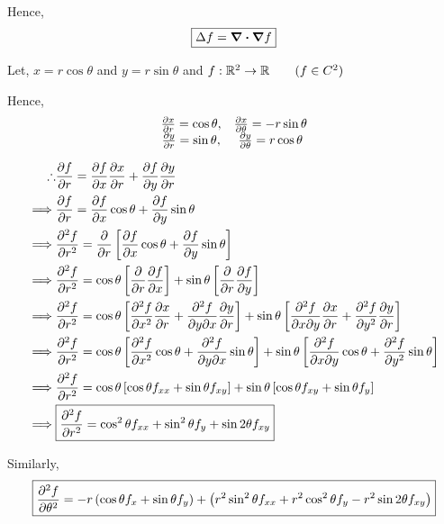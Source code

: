 \documentclass[../Analysis-3]{subfiles}
\begin{document}
Hence, \[\boxed{\Delta f = \div\grad f}\]

Let, $x = r\cos{\theta}$ and $y= r\sin{\theta}$ and $f : \mathbb{R}^2 \to \mathbb{R} \qquad ( f \in C^2) $

Hence,
\[\begin{matrix}
        \pdv{x}{r} = \cos{\theta}, & \pdv{x}{\theta} = -r\sin{\theta} \\
        \pdv{y}{r} = \sin{\theta}, & \pdv{y}{\theta} = r\cos{\theta}
    \end{matrix}\]

\begin{align*}
    \therefore & \pdv{f}{r} = \pdv{f}{x} \pdv{x}{r} + \pdv{f}{y}\pdv{y}{r}                                                                                                                               \\
    \implies   & \pdv{f}{r} = \pdv{f}{x} \cos{\theta} + \pdv{f}{y}\sin{\theta}                                                                                                                           \\
    \implies   & \pdv[2]{f}{r} = \pdv{}{r} \left[\pdv{f}{x} \cos{\theta} + \pdv{f}{y} \sin{\theta} \right]                                                                                               \\
    \implies   & \pdv[2]{f}{r} = \cos{\theta} \left[\pdv{}{r} \pdv{f}{x}\right] + \sin{\theta} \left[\pdv{}{r} \pdv{f}{y} \right]                                                                        \\
    \implies   & \pdv[2]{f}{r} = \cos{\theta} \left[\pdv[2]{f}{x} \pdv{x}{r} + \pdv{f}{y}{x} \pdv{y}{r} \right] + \sin{\theta} \left[\pdv{f}{x}{y} \pdv{x}{r} + \pdv[2]{f}{y} \pdv{y}{r} \right]         \\
    \implies   & \pdv[2]{f}{r} = \cos{\theta} \left[\pdv[2]{f}{x} \cos{\theta} + \pdv{f}{y}{x} \sin{\theta} \right] + \sin{\theta} \left[\pdv{f}{x}{y} \cos{\theta} + \pdv[2]{f}{y} \sin{\theta} \right] \\
    \implies   & \pdv[2]{f}{r} = \cos{\theta} \left[\cos{\theta} f_{xx} + \sin{\theta} f_{xy} \right] + \sin{\theta} \left[\cos{\theta} f_{xy} + \sin{\theta} f_{y} \right]                              \\
    \implies   & \boxed{\pdv[2]{f}{r} = \cos^2 \theta f_{xx} + \sin^2 \theta f_{y} + \sin 2 \theta f_{xy}}
\end{align*}


Similarly, \[ \boxed{\pdv[2]{f}{\theta} = -r \left( \cos{\theta} f_x + \sin{\theta} f_y \right) + \left( r^2\sin^2 \theta f_{xx} + r^2\cos^2 \theta f_{y} - r^2\sin 2 \theta f_{xy} \right)} \]
\end{document}

